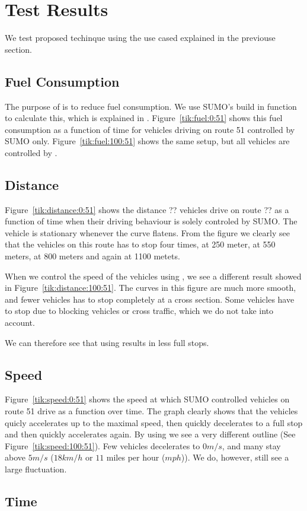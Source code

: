 \section{Test Results}
We test proposed techinque using the use cased explained in the previouse section.

\subsection{Fuel Consumption}
The purpose of \tech is to reduce fuel consumption. 
We use SUMO's build in function to calculate this, which is explained in \cite{SUMOFuel}.
Figure~\ref{tik:fuel:0:51} shows this fuel consumption as a function of time for vehicles driving on route 51 controlled by SUMO only. Figure~\ref{tik:fuel:100:51} shows the same setup, but all vehicles are controlled by \tech.

%
%



\subsection{Distance}
Figure~\ref{tik:distance:0:51} shows the distance ?? vehicles drive on route ?? as a function of time when their driving behaviour is solely controled by SUMO. 
The vehicle is stationary whenever the curve flatens.
From the figure we clearly see that the vehicles on this route has to stop four times, at 250 meter, at 550 meters, at 800 meters and again at 1100 metets.

When we control the speed of the vehicles using \tech, we see a different result showed in Figure~\ref{tik:distance:100:51}.
The curves in this figure are much more smooth, and fewer vehicles has to stop completely at a cross section.
Some vehicles have to stop due to blocking vehicles or cross traffic, which we do not take into account.

We can therefore see that using \tech results in less full stops.
%
%

\subsection{Speed}
Figure~\ref{tik:speed:0:51} shows the speed at which SUMO controlled vehicles on route 51 drive as a function over time.
The graph clearly shows that the vehicles quicly accelerates up to the maximal speed, then quickly decelerates to a full stop and then quickly accelerates again.
By using \tech we see a very different outline (See Figure~\ref{tik:speed:100:51}).
Few vehicles decelerates to $0 m/s$, and many stay above $5 m/s$ ($18 km/h$ or $11$ miles per hour ($mph$)).
We do, however, still see a large fluctuation.
%
%


\subsection{Time}
